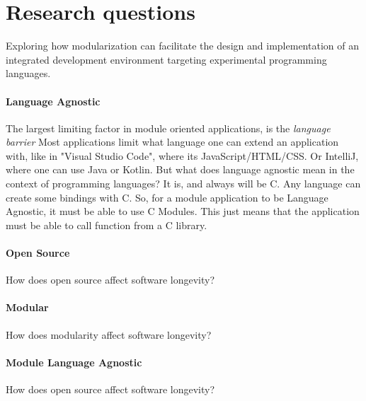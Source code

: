 \section{Research questions}

Exploring how modularization can facilitate the design and implementation of
an integrated development environment targeting experimental programming
languages.




\paragraph{Language Agnostic} The largest limiting factor in module oriented
applications, is the \textit{language barrier} Most applications limit what
language one can extend an application with, like in "Visual Studio Code", where
its JavaScript/HTML/CSS. Or IntelliJ, where one can use Java or Kotlin. But what
does language agnostic mean in the context of programming languages? It is, and
always will be C. Any  language can create some bindings with C.
So, for a module application to be Language Agnostic, it must be able to use C
Modules. This just means that the application must be able to call function from
a C library.


\paragraph{Open Source} How does open source affect software longevity?

\paragraph{Modular} How does modularity affect software longevity?

\paragraph{Module Language Agnostic} How does open source affect software
longevity?
